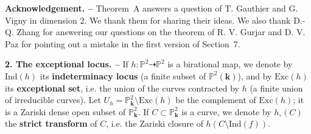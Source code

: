 \documentclass[reqno,oneside,12pt]{amsart}
\theoremstyle{plain}
\theoremstyle{definition}
\def\Z{\mathbf{Z}}
\def\bfk{{\mathbf{k}}}
\def\P{\mathbb{P}}
\def\Aut{{\sf{Aut}}}
\def\Bir{{\sf{Bir}}}
\def\GL{{\sf{GL}}}
\def\Ind{{\text{Ind}}}
\def\Exc{{\text{Exc}}}
\begin{document}

\smallskip

{\noindent}{\bf{Acknowledgement. --}} Theorem~A answers a question of T. Gauthier and G. Vigny in dimension $2$. We thank them 
for sharing their ideas. We also thank D.-Q. Zhang for answering our questions on the theorem of R. V. Gurjar and D. V. Paz for pointing out a mistake in the first version of Section~7.

\medskip


{\noindent}{\bf{2. The exceptional locus. --}}
If $h:\P^2\dashrightarrow \P^2$ is a birational map, we denote by $\Ind(h)$ its {\bf{indeterminacy locus}} (a finite subset of 
$\P^2(\bfk)$), and by $\Exc(h)$ its {\bf{exceptional set}}, i.e. the union of the curves contracted by $h$ (a finite union of irreducible curves). 
Let $U_h=\P^2_\bfk\setminus \Exc(h)$ be the complement of $\Exc(h)$; it is a Zariski dense open subset of $\P^2_\bfk$.
If $C\subset \P^2_\bfk$ is a curve, we denote by $h_\circ(C)$ the {\bf{strict transform}} of $C$, i.e. the Zariski closure of $h(C\setminus \Ind(f))$.
\end{document}

